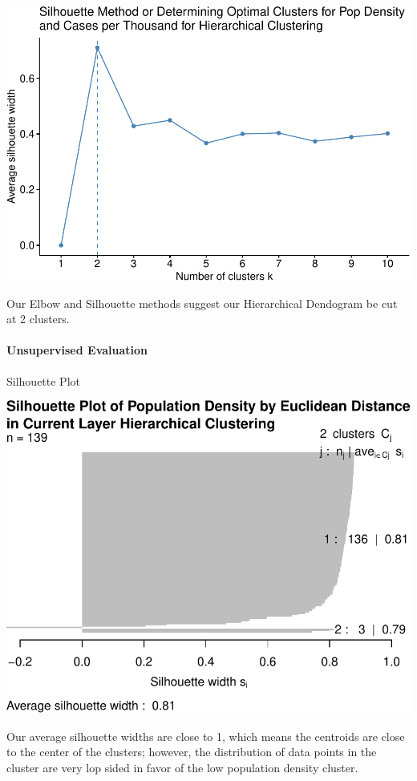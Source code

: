 \documentclass[
]{article}
\begin{document}
\includegraphics{Final-Report_files/figure-latex/unnamed-chunk-20-1.pdf}

Our Elbow and Silhouette methods suggest our Hierarchical Dendogram be
cut at 2 clusters.

\paragraph{Unsupervised Evaluation}\label{unsupervised-evaluation-3}

Silhouette Plot

\includegraphics{Final-Report_files/figure-latex/unnamed-chunk-22-1.pdf}

Our average silhouette widths are close to 1, which means the centroids
are close to the center of the clusters; however, the distribution of
data points in the cluster are very lop sided in favor of the low
population density cluster.
\end{document}
